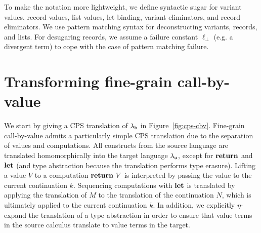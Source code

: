 \documentclass[12pt,phd,lfcs,twoside,openright,logo,leftchapter,normalheadings]{infthesis}
\theoremstyle{plain}
\theoremstyle{definition}
\begin{document}
To make the notation more lightweight, we define syntactic sugar for
variant values, record values, list values, let binding, variant
eliminators, and record eliminators. We use pattern matching syntax
for deconstructing variants, records, and lists. For desugaring
records, we assume a failure constant $\ell_\bot$ (e.g. a divergent
term) to cope with the case of pattern matching failure.

\section{Transforming fine-grain call-by-value}
\label{sec:cps-cbv}

We start by giving a CPS translation of $\lambda_{\mathsf{b}}$ in
Figure~\ref{fig:cps-cbv}. Fine-grain call-by-value admits a
particularly simple CPS translation due to the separation of values
and computations. All constructs from the source language are
translated homomorphically into the target language $\lambda_{\mathsf{u}}$, except
for $\mathbf{return}$ and $\mathbf{let}$ (and type abstraction because the translation
performs type erasure). Lifting a value $V$ to a computation
$\mathbf{return}~V$ is interpreted by passing the value to the current
continuation $k$. Sequencing computations with $\mathbf{let}$ is translated by
applying the translation of $M$ to the translation of the continuation
$N$, which is ultimately applied to the current continuation $k$. In
addition, we explicitly $\eta$-expand the translation of a type
abstraction in order to ensure that value terms in the source calculus
translate to value terms in the target.
\end{document}
